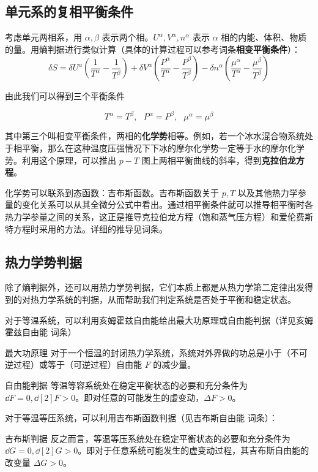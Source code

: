 \subsection{单元系的复相平衡条件}
考虑单元两相系，用 $\alpha,\beta$ 表示两个相。$U^\alpha,V^\alpha,n^\alpha$ 表示 $\alpha$ 相的内能、体积、物质的量。用熵判据进行类似计算（具体的计算过程可以参考词条\textbf{相变平衡条件}）：
\begin{equation}
\delta S=\delta U^\alpha\left(\frac{1}{T^\alpha}-\frac{1}{T^\beta}\right)+\delta V^\alpha\left(\frac{P^\alpha}{T^\alpha}-\frac{P^\beta}{T^\beta}\right)
-\delta n^\alpha\left(\frac{\mu^\alpha}{T^\alpha}-\frac{\mu^\beta}{T^\beta}\right)
\end{equation}

由此我们可以得到三个平衡条件

\begin{equation}
T^\alpha=T^\beta,\ \ \ P^\alpha=P^\beta,\ \ \ \mu^\alpha=\mu^\beta
\end{equation}

其中第三个叫相变平衡条件，两相的\textbf{化学势}相等。例如，若一个冰水混合物系统处于相平衡，那么在这种温度压强情况下下冰的摩尔化学势一定等于水的摩尔化学势。利用这个原理，可以推出 $p-T$ 图上两相平衡曲线的斜率，得到\textbf{克拉伯龙方程}。

化学势可以联系到态函数：吉布斯函数。吉布斯函数关于 $p,T$ 以及其他热力学参量的变化关系可以从其全微分公式中看出。通过相平衡条件就可以推导相平衡时各热力学参量之间的关系，这正是推导克拉伯龙方程（饱和蒸气压方程）和爱伦费斯特方程时采用的方法。详细的推导见词条。
\subsection{热力学势判据}
除了熵判据外，还可以用热力学势判据，它们本质上都是从热力学第二定律出发得到的对热力学系统的判据，从而帮助我们判定系统是否处于平衡和稳定状态。

对于等温系统，可以利用亥姆霍兹自由能给出最大功原理或自由能判据（详见亥姆霍兹自由能 词条）
\begin{theorem}{最大功原理}
对于一个恒温的封闭热力学系统，系统对外界做的功总是小于（不可逆过程）或等于（可逆过程）自由能 $F$ 的减少量。
\end{theorem}
\begin{theorem}{自由能判据}
等温等容系统处在稳定平衡状态的必要和充分条件为 $\dd F=0,\dd[2]{F}>0$。即对任意的可能发生的虚变动，$\Delta F>0$。
\end{theorem}

对于等温等压系统，可以利用吉布斯函数判据（见吉布斯自由能 词条）：
\begin{theorem}{吉布斯判据}
反之而言，等温等压系统处在稳定平衡状态的必要和充分条件为 
$\dd G=0, \dd[2]{G}>0$。即对于任意系统可能发生的虚变动过程，其吉布斯自由能的改变量 $\Delta G>0$。
\end{theorem}
